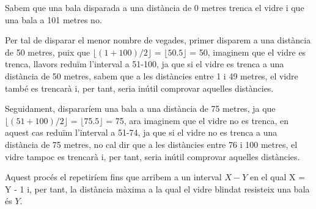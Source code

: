 Sabem que una bala disparada a una distància de 0 metres trenca el vidre i que una bala a 101 metres no.

Per tal de disparar el menor nombre de vegades, primer disparem a una distància de 50 metres, puix que
$ \lfloor (1 + 100) / 2 \rfloor $ = $ \lfloor 50.5 \rfloor $ = 50, imaginem que el vidre es trenca, llavors reduïm l'interval a 51-100, ja que si el vidre es trenca a una distància de 50 metres, sabem que a les distàncies entre 1 i 49 metres, el vidre també es trencarà i, per tant, seria inútil comprovar aquelles distàncies.

Seguidament, dispararíem una bala a una distància de 75 metres, ja que $ \lfloor (51 + 100) / 2 \rfloor $ = $ \lfloor 75.5 \rfloor $ = 75, ara imaginem que el vidre no es trenca, en aquest cas reduïm l'interval a 51-74, ja que si el vidre no es trenca a una distància de 75 metres, no cal dir que a les distàncies entre 76 i 100 metres, el vidre tampoc es trencarà i, per tant, seria inútil comprovar aquelles distàncies.

Aquest procés el repetiríem fins que arribem a un interval $X - Y$ en el qual X = Y - 1 i, per tant, la distància màxima a la qual el vidre blindat resisteix una bala és $Y$.

